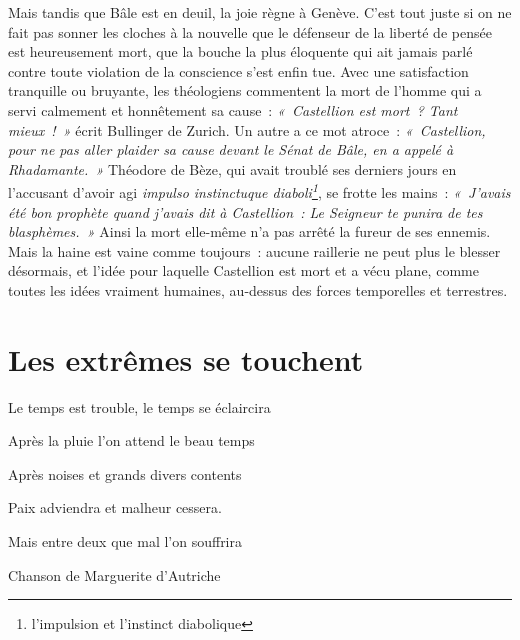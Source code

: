 \documentclass[french,twoside]{book} %
\newcommand\foreign[1]{\emph{#1}}
\newcommand{\bibl}[1]{{\smallskip\RaggedLeft\normalsize\normalfont #1\par\medskip}}}
\newcommand{\spl}[1]{\noindent\hangindent=2\parindent  #1\par} %
\newenvironment{epigraph}{\begin{addmargin}[2\parindent]{0em}\sffamily\large\setstretch{0.95}}{\end{addmargin}\bigskip}
\newcommand\chapteropen{} %
\newcommand\chapterclose{} %
\begin{document}
\noindent Mais tandis que Bâle est en deuil, la joie règne à Genève. C’est tout juste si on ne fait pas sonner les cloches à la nouvelle que le défenseur de la liberté de pensée est heureusement mort, que la bouche la plus éloquente qui ait jamais parlé contre toute violation de la conscience s’est enfin tue. Avec une satisfaction tranquille ou bruyante, les théologiens commentent la mort de l’homme qui a servi calmement et honnêtement sa cause : \emph{« Castellion est mort ? Tant mieux ! »} écrit Bullinger de Zurich. Un autre a ce mot atroce : \emph{« Castellion, pour ne pas aller plaider sa cause devant le Sénat de Bâle, en a appelé à Rhadamante. »} Théodore de Bèze, qui avait troublé ses derniers jours en l’accusant d’avoir agi \foreign{impulso instinctuque diaboli\footnote{l’impulsion et l’instinct diabolique}}, se frotte les mains : \emph{« J’avais été bon prophète quand j’avais dit à Castellion : Le Seigneur te punira de tes blasphèmes. »} Ainsi la mort elle-même n’a pas arrêté la fureur de ses ennemis. Mais la haine est vaine comme toujours : aucune raillerie ne peut plus le blesser désormais, et l’idée pour laquelle Castellion est mort et a vécu plane, comme toutes les idées vraiment humaines, au-dessus des forces temporelles et terrestres.
\chapterclose


\chapteropen

\chapter[{Les extrêmes se touchent}]{Les extrêmes se touchent}
\renewcommand{\leftmark}{Les extrêmes se touchent}


\begin{epigraph}
\spl{Le temps est trouble, le temps se éclaircira}
\spl{Après la pluie l’on attend le beau temps}
\spl{Après noises et grands divers contents}
\spl{}
\spl{Paix adviendra et malheur cessera.}
\spl{Mais entre deux que mal l’on souffrira}

\bibl{Chanson de Marguerite d’Autriche}
\end{epigraph}
\end{document}
